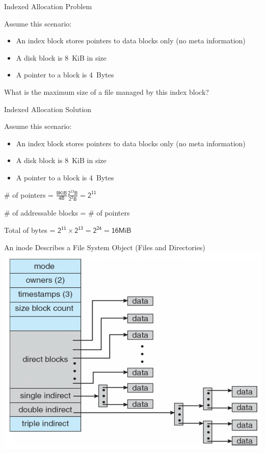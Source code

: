   \begin{frame}{Indexed Allocation Problem}
    
    Assume this scenario:
    \begin{itemize}
      \item An index block stores pointers to data blocks only (no meta information)
      \item A disk block is 8~KiB in size
      \item A pointer to a block is 4~Bytes
    \end{itemize}

    \vspace{2em}

    What is the maximum size of a file managed by this index block?
  \end{frame}

  \begin{frame}{Indexed Allocation Solution}
    
    Assume this scenario:
    \begin{itemize}
      \item An index block stores pointers to data blocks only (no meta information)
      \item A disk block is 8~KiB in size
      \item A pointer to a block is 4~Bytes
    \end{itemize}

    \vspace{2em}

    \# of pointers = $\mathsf{\frac{8 KiB}{4 B} \frac{2^{13} B}{2^2 B} = 2^{11}}$

    \# of addressable blocks = \# of pointers

    Total of bytes = $\mathsf{2^{11} \times 2^{13} = 2^{24} = 16 MiB}$
  \end{frame}

  \begin{frame}{An inode Describes a File System Object (Files and Directories)}
    \includegraphics[height=0.8\textheight]{hinode.png}
  \end{frame}

